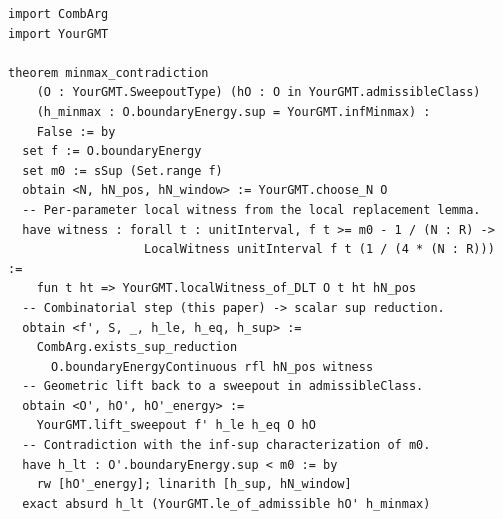 \begin{lstlisting}[caption={End-to-end script for a min-max
contradiction.}, label=lst:end-to-end]
import CombArg
import YourGMT

theorem minmax_contradiction
    (O : YourGMT.SweepoutType) (hO : O in YourGMT.admissibleClass)
    (h_minmax : O.boundaryEnergy.sup = YourGMT.infMinmax) :
    False := by
  set f := O.boundaryEnergy
  set m0 := sSup (Set.range f)
  obtain <N, hN_pos, hN_window> := YourGMT.choose_N O
  -- Per-parameter local witness from the local replacement lemma.
  have witness : forall t : unitInterval, f t >= m0 - 1 / (N : R) ->
                   LocalWitness unitInterval f t (1 / (4 * (N : R))) :=
    fun t ht => YourGMT.localWitness_of_DLT O t ht hN_pos
  -- Combinatorial step (this paper) -> scalar sup reduction.
  obtain <f', S, _, h_le, h_eq, h_sup> :=
    CombArg.exists_sup_reduction
      O.boundaryEnergyContinuous rfl hN_pos witness
  -- Geometric lift back to a sweepout in admissibleClass.
  obtain <O', hO', hO'_energy> :=
    YourGMT.lift_sweepout f' h_le h_eq O hO
  -- Contradiction with the inf-sup characterization of m0.
  have h_lt : O'.boundaryEnergy.sup < m0 := by
    rw [hO'_energy]; linarith [h_sup, hN_window]
  exact absurd h_lt (YourGMT.le_of_admissible hO' h_minmax)
\end{lstlisting}

